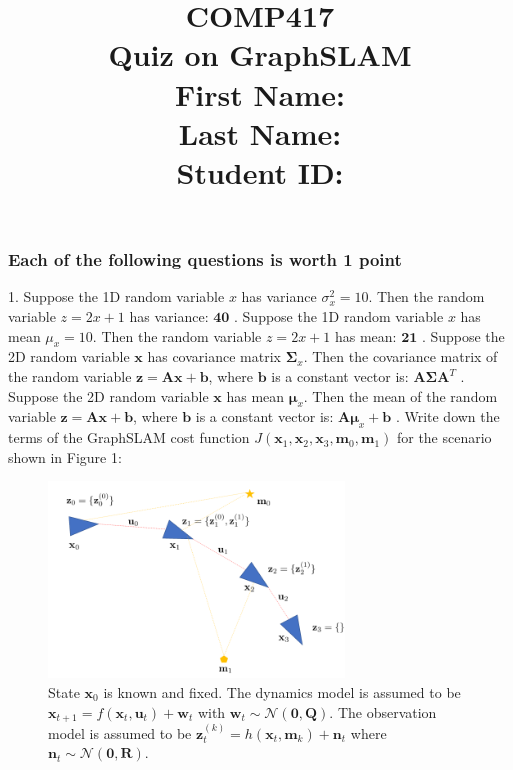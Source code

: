 \documentclass[a4paper,10pt]{article}
\date{\displaydate{date}}
\title{COMP417\\Quiz on GraphSLAM\\First Name:\\Last Name:\\Student ID:}
\begin{document}
\maketitle

\subsubsection*{Each of the following questions is worth 1 point}
1. Suppose the 1D random variable $x$ has variance $\sigma_x^2=10$. Then the random variable $z=2x+1$ has variance: $\textbf{40}$
\newline
{}. Suppose the 1D random variable $x$ has mean $\mu_x=10$. Then the random variable $z=2x+1$ has mean: $\textbf{21}$
\newline
{}. Suppose the 2D random variable $\textbf{x}$ has covariance matrix $\boldsymbol{\Sigma}_x$. Then the covariance matrix of the random variable $\textbf{z}=\textbf{A}\boldsymbol{x} + \textbf{b}$, where $\textbf{b}$ is a 
constant vector is: $\textbf{A}\boldsymbol{\Sigma}\textbf{A}^T$
\newline
{}. Suppose the 2D random variable $\textbf{x}$ has mean $\boldsymbol{\mu}_x$. Then the mean of the random variable $\textbf{z}=\textbf{A}\boldsymbol{x} + \textbf{b}$, where $\textbf{b}$ is a 
constant vector is: $\textbf{A}\boldsymbol{\mu}_x+\textbf{b}$
\newline
{}. Write down the terms of the GraphSLAM cost function $J(\textbf{x}_1, \textbf{x}_2, \textbf{x}_3, \textbf{m}_0, \textbf{m}_1)$ for the scenario shown in Figure 1:
\begin{figure}[h]
  \begin{center}
    \includegraphics[width=0.7\textwidth]{quiz6fig}
  \end{center}
  \caption{State $\textbf{x}_0$ is known and fixed. The dynamics model is assumed to be $\textbf{x}_{t+1}=f(\textbf{x}_t, \textbf{u}_t) + \textbf{w}_t$ with $\textbf{w}_t \sim \mathcal{N}(\textbf{0}, \textbf{Q})$. 
  The observation model is assumed to be $\textbf{z}_t^{(k)}=h(\textbf{x}_t, \textbf{m}_k)+\textbf{n}_t$ where $\textbf{n}_t \sim \mathcal{N}(\textbf{0}, \textbf{R})$.}
\end{figure}
\end{document}

